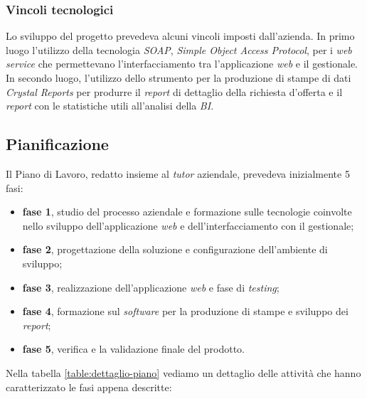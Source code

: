 \subsubsection{Vincoli tecnologici}
Lo sviluppo del progetto prevedeva alcuni vincoli imposti dall'azienda.
In primo luogo l'utilizzo della tecnologia \textit{SOAP}, \textit{Simple Object Access Protocol}, per i \textit{web service} che permettevano l'interfacciamento tra l'applicazione \textit{web} e il gestionale.
In secondo luogo, l'utilizzo dello strumento per la produzione di stampe di dati \textit{Crystal Reports} per produrre il \textit{report} di dettaglio della richiesta d'offerta e il \textit{report} con le statistiche utili all'analisi della \textit{BI}.

\newpage
\subsection{Pianificazione}

Il Piano di Lavoro, redatto insieme al \textit{tutor} aziendale, prevedeva inizialmente 5 fasi:
\begin{itemize}
	\item \textbf{fase 1}, studio del processo aziendale e formazione sulle tecnologie coinvolte nello sviluppo dell'applicazione \textit{web} e dell'interfacciamento con il gestionale;
	\item \textbf{fase 2}, progettazione della soluzione e configurazione dell'ambiente di sviluppo;
	\item \textbf{fase 3}, realizzazione dell'applicazione \textit{web} e fase di \textit{testing};
	\item \textbf{fase 4}, formazione sul \textit{software} per la produzione di stampe e sviluppo dei \textit{report};
	\item \textbf{fase 5}, verifica e la validazione finale del prodotto.
\end{itemize}
Nella tabella \ref{table:dettaglio-piano} vediamo un dettaglio delle attività che hanno caratterizzato le fasi appena descritte:

